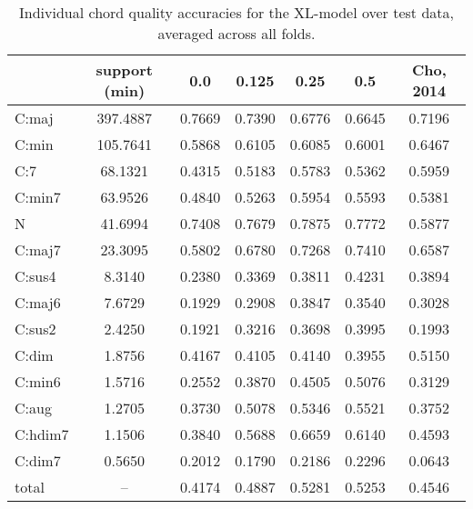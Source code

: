 \begin{table}[h]
\begin{center}
\scriptsize
\caption{Individual chord quality accuracies for the XL-model over test data, averaged across all folds.}
\begin{tabular}{l|ccccc|c}
\hline
    &   support (min) &    0.0 &   0.125 &   0.25 &    0.5 & Cho, 2014\\
\hline
 C:maj     &  397.4887 & 0.7669 &  0.7390 & 0.6776 & 0.6645 & 0.7196\\
 C:min     &  105.7641 & 0.5868 &  0.6105 & 0.6085 & 0.6001 & 0.6467\\
 C:7       &   68.1321 & 0.4315 &  0.5183 & 0.5783 & 0.5362 & 0.5959\\
 C:min7    &   63.9526 & 0.4840 &  0.5263 & 0.5954 & 0.5593 & 0.5381\\
 N         &   41.6994 & 0.7408 &  0.7679 & 0.7875 & 0.7772 & 0.5877\\
 C:maj7    &   23.3095 & 0.5802 &  0.6780 & 0.7268 & 0.7410 & 0.6587\\
 \hline
 C:sus4    &    8.3140 & 0.2380 &  0.3369 & 0.3811 & 0.4231 & 0.3894\\
 C:maj6    &    7.6729 & 0.1929 &  0.2908 & 0.3847 & 0.3540 & 0.3028\\
 C:sus2    &    2.4250 & 0.1921 &  0.3216 & 0.3698 & 0.3995 & 0.1993\\
 C:dim     &    1.8756 & 0.4167 &  0.4105 & 0.4140 & 0.3955 & 0.5150\\
 C:min6    &    1.5716 & 0.2552 &  0.3870 & 0.4505 & 0.5076 & 0.3129\\
 C:aug     &    1.2705 & 0.3730 &  0.5078 & 0.5346 & 0.5521 & 0.3752\\
 C:hdim7   &    1.1506 & 0.3840 &  0.5688 & 0.6659 & 0.6140 & 0.4593\\
 C:dim7    &    0.5650 & 0.2012 &  0.1790 & 0.2186 & 0.2296 & 0.0643\\
 \hline
 total & -- & 0.4174 &  0.4887 & 0.5281 & 0.5253 & 0.4546 \\
\hline
\end{tabular}
\end{center}
\end{table}


